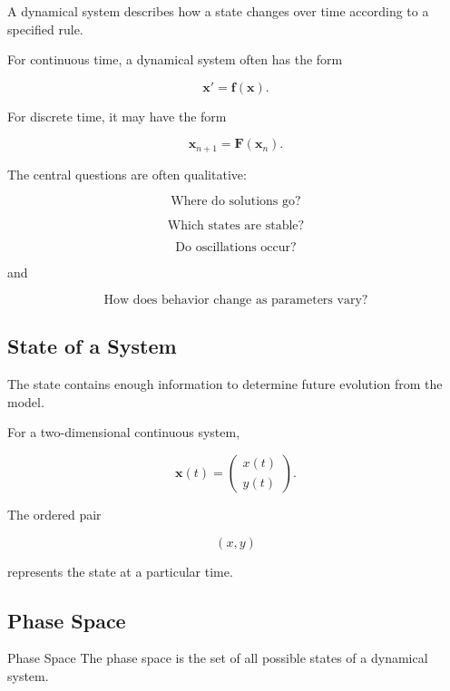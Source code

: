 A dynamical system describes how a state changes over time according to a
specified rule.

For continuous time, a dynamical system often has the form

\[
\boxed{
\mathbf{x}'
=
\mathbf{f}(\mathbf{x}).
}
\]

For discrete time, it may have the form

\[
\boxed{
\mathbf{x}_{n+1}
=
\mathbf{F}(\mathbf{x}_n).
}
\]

The central questions are often qualitative:

\[
\boxed{
\text{Where do solutions go?}
}
\]

\[
\boxed{
\text{Which states are stable?}
}
\]

\[
\boxed{
\text{Do oscillations occur?}
}
\]

and

\[
\boxed{
\text{How does behavior change as parameters vary?}
}
\]

\subsection{State of a System}
\label{subsec:dynamical-state}

The state contains enough information to determine future evolution from
the model.

For a two-dimensional continuous system,

\[
\boxed{
\mathbf{x}(t)
=
\begin{pmatrix}
x(t)\\
y(t)
\end{pmatrix}.
}
\]

The ordered pair

\[
(x,y)
\]

represents the state at a particular time.

\subsection{Phase Space}
\label{subsec:phase-space}

\begin{definitionbox}{Phase Space}
The phase space is the set of all possible states of a dynamical system.
\end{definitionbox}

